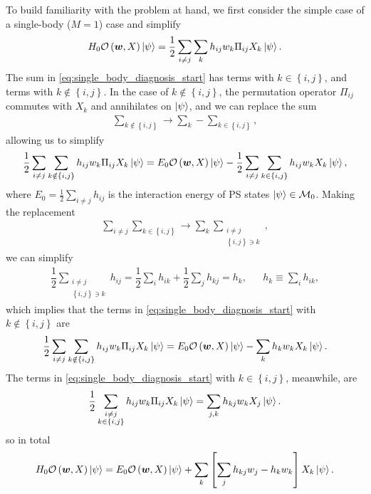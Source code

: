 \documentclass[nofootinbib,notitlepage,11pt]{revtex4-2}
\newcommand{\f}[2]{\dfrac{#1}{#2}} %
\newcommand{\p}[1]{\left(#1\right)} %
\renewcommand{\sp}[1]{\left[#1\right]} %
\renewcommand{\set}[1]{\left\{#1\right\}} %
\newcommand{\m}{\bm} %
\newcommand{\1}{\mathds{1}}
\newcommand{\M}{\mathcal{M}}
\renewcommand{\O}{\mathcal{O}}
\begin{document}
To build familiarity with the problem at hand, we first consider the simple case of a single-body ($M=1$) case and simplify
\begin{align}
  H_0 \O\p{\m w,X} \ket\psi
  = \f12 \sum_{i\ne j} \sum_k h_{ij} w_k \Pi_{ij} X_k \ket\psi.
  \label{eq:single_body_diagnosis_start}
\end{align}
The sum in \eqref{eq:single_body_diagnosis_start} has terms with $k\in\set{i,j}$, and terms with $k\notin\set{i,j}$.
In the case of $k\notin\set{i,j}$, the permutation operator $\Pi_{ij}$ commutes with $X_k$ and annihilates on $\ket\psi$, and we can replace the sum
\begin{align}
  \sum_{k\notin\set{i,j}} \to \sum_k - \sum_{k\in\set{i,j}},
\end{align}
allowing us to simplify
\begin{align}
  \f12 \sum_{i\ne j} \sum_{k\notin\set{i,j}}
  h_{ij} w_k \Pi_{ij} X_k \ket\psi
  = E_0 \O\p{\m w,X} \ket\psi
  - \f12 \sum_{i\ne j} \sum_{k\in\set{i,j}} h_{ij} w_k X_k \ket\psi,
\end{align}
where $E_0=\frac12\sum_{i\ne j}h_{ij}$ is the interaction energy of PS states $\ket\psi\in\M_0$.
Making the replacement
\begin{align}
  \sum_{i\ne j} \sum_{k\in\set{i,j}}
  \to \sum_k \sum_{\substack{i\ne j\\\set{i,j}\ni k}},
\end{align}
we can simplify
\begin{align}
  \f12 \sum_{\substack{i\ne j\\\set{i,j}\ni k}} h_{ij}
  = \f12 \sum_i h_{ik} + \f12 \sum_j h_{kj}
  = h_k,
  &&
  h_k \equiv \sum_i h_{ik},
\end{align}
which implies that the terms in \eqref{eq:single_body_diagnosis_start} with $k\notin\set{i,j}$ are
\begin{align}
  \f12 \sum_{i\ne j} \sum_{k\notin\set{i,j}}
  h_{ij} w_k \Pi_{ij} X_k \ket\psi
  = E_0 \O\p{\m w,X} \ket\psi - \sum_k h_k w_k X_k \ket\psi.
\end{align}
The terms in \eqref{eq:single_body_diagnosis_start} with $k\in\set{i,j}$, meanwhile, are
\begin{align}
  \f12 \sum_{\substack{i\ne j\\k\in\set{i,j}}}
  h_{ij} w_k \Pi_{ij} X_k \ket\psi
  = \sum_{j,k} h_{kj} w_k X_j \ket\psi.
\end{align}
so in total
\begin{align}
  H_0 \O\p{\m w,X} \ket\psi
  = E_0 \O\p{\m w,X} \ket\psi
  + \sum_k \sp{\sum_j h_{kj} w_j - h_k w_k} X_k \ket\psi.
  \label{eq:single_body_diagnosis_end}
\end{align}
\end{document}
